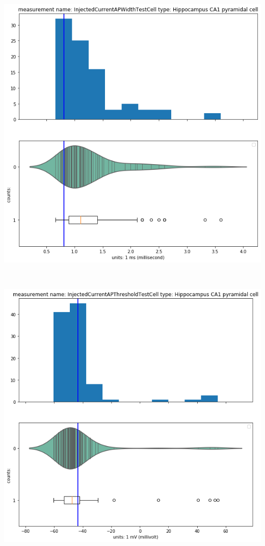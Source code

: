     \begin{center}
    \includegraphics[width=0.7\linewidth]{notebooks_converted/needata_thesis_files/needata_thesis_5_32}
    \end{center}
    { \hspace*{\fill} \\}
    
    \begin{center}
    \includegraphics[width=0.7\linewidth]{notebooks_converted/needata_thesis_files/needata_thesis_5_33}
    \end{center}
    { \hspace*{\fill} \\}
    
